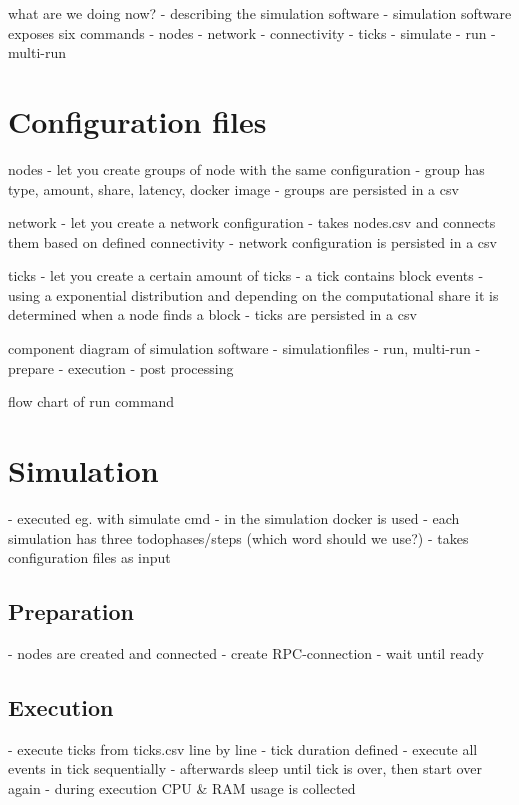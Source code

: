 what are we doing now?
 - describing the simulation software
 - simulation software exposes six commands
   - nodes
   - network
   - connectivity
   - ticks
   - simulate
   - run
   - multi-run

\section{Configuration files}

nodes
 - let you create groups of node with the same configuration
 - group has type, amount, share, latency, docker image
 - groups are persisted in a csv
 
network
 - let you create a network configuration
 - takes nodes.csv and connects them based on defined connectivity
 - network configuration is persisted in a csv

ticks
 - let you create a certain amount of ticks
 - a tick contains block events
 - using a exponential distribution and depending on the computational share it is determined when a node finds a block
 - ticks are persisted in a csv

component diagram of simulation software
 - simulationfiles
 - run, multi-run
 -  prepare
 - execution
 - post processing
 
 flow chart of run command

\section{Simulation}

 - executed eg. with simulate cmd
 - in the simulation docker is used
 - each simulation has three todo{phases/steps (which word should we use?)}
 - takes configuration files as input 

\subsection{Preparation}
 - nodes are created and connected
 - create RPC-connection
 - wait until ready
\subsection{Execution}
 - execute ticks from ticks.csv line by line
 - tick duration defined
 - execute all events in tick sequentially
 - afterwards sleep until tick is over, then start over again
 - during execution CPU \& RAM usage is collected
